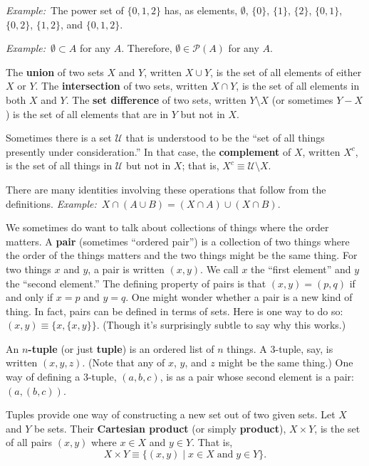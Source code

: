 \documentclass[12pt, a4paper]{article}
\newcommand{\defn}[1]{\textbf{#1}}
\newcommand{\eg}{\emph{Example:}\relax}
\begin{document}
\eg\ The power set of $\{0,1,2\}$ has, as elements, $\emptyset$, $\{0\}$,
$\{1\}$, $\{2\}$, $\{0,1\}$, $\{0,2\}$, $\{1,2\}$, and $\{0,1,2\}$.

\eg\ $\emptyset \subset A$ for any $A$. Therefore, $\emptyset \in \mathcal{P}(A)$ for any $A$. 

The \defn{union} of two sets $X$ and $Y$, written $X \cup Y$, is the set
of all elements of either $X$ or $Y$. The \defn{intersection} of two
sets, written $X \cap Y$, is the set of all elements in both $X$ and
$Y$. The \defn{set difference} of two sets, written $Y \setminus X$ (or
sometimes $Y-X$) is the set of all elements that are in $Y$ but not in
$X$.

Sometimes there is a set $\mathcal{U}$ that is understood to be the “set of all
things presently under consideration.” In that case, the
\defn{complement} of $X$, written $X^c$, is the set of all things in
$\mathcal{U}$ but not in $X$; that is, $X^c \equiv \mathcal{U} \setminus X$.

There are many identities involving these operations that follow from
the definitions.
\eg\ $X\cap(A\cup B) = (X\cap A) \cup (X\cap B)$.

We sometimes do want to talk about collections of things where the
order matters. A \defn{pair} (sometimes “ordered pair”) is a
collection of two things where the order of the things matters and the
two things might be the same thing. For two things $x$ and $y$, a pair
is written $(x, y)$. We call $x$ the “first element” and $y$ the
“second element.” The defining property of pairs is that $(x,y)=(p,q)$
if and only if $x=p$ and $y=q$. One might wonder whether a pair is a
new kind of thing. In fact, pairs can be defined in terms of
sets. Here is one way to do so: $(x, y)\equiv \{x, \{x,y\}\}$. (Though it's
surprisingly subtle to say why this works.)

An \defn{$n$-tuple} (or just \defn{tuple}) is an ordered list of $n$
things. A 3-tuple, say, is written $(x, y, z)$. (Note that any of $x$,
$y$, and $z$ might be the same thing.) One way of defining a 3-tuple,
$(a, b, c)$, is as a pair whose second element is a pair: $(a, (b,
c))$.
  
Tuples provide one way of constructing a new set out of two given
sets. Let $X$ and $Y$ be sets. Their \defn{Cartesian product} (or
simply \defn{product}), $X \times Y$, is the set of all pairs $(x, y)$
where $x \in X$ and $y \in Y$. That is,
\begin{equation*}
X\times Y\equiv \{(x, y) \mid x\in X\;\text{and}\; y\in Y\}.
\end{equation*}
\end{document}
